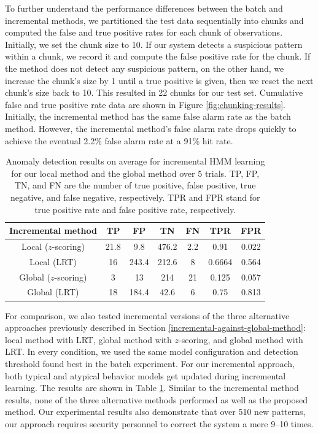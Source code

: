 To further understand the performance differences between the batch
and incremental methods, we partitioned the test data sequentially
into chunks and computed the false and true positive rates for each
chunk of observations.  Initially, we set the chunk size to 10. If our
system detects a suspicious pattern within a chunk, we record it and
compute the false positive rate for the chunk. If the method does not
detect any suspicious pattern, on the other hand, we increase the
chunk's size by 1 until a true positive is given, then we reset the
next chunk's size back to 10. This resulted in 22 chunks for our test
set. Cumulative false and true positive rate data are shown in
Figure \ref{fig:chunking-results}. Initially, the incremental
method has the same false alarm rate as the batch method.  However,
the incremental method's false alarm rate drops quickly to achieve the
eventual 2.2\% false alarm rate at a 91\% hit rate.

\begin{table}[t]
  \caption[Anomaly detection results on average for incremental HMM
    learning for our local method and the global method over 5
    trials.]{\small Anomaly detection results on average for
    incremental HMM learning for our local method and the global
    method over 5 trials. TP, FP, TN, and FN are the number of true positive, 
    false positive, true negative, and false negative, respectively. 
    TPR and FPR stand for true positive rate and false positive rate, 
    respectively.}
  \begin{center}
    \begin{tabular}{c|c|c|c|c|c|c}
      \hline
      Incremental method & TP & FP & TN & FN & TPR & FPR \\
      \hline \hline
      Local ($z$-scoring) & 21.8 & 9.8  & 476.2  & 2.2 & 0.91 & 0.022 \\ \hline
      Local (LRT) & 16 & 243.4 & 212.6 & 8 & 0.6664 & 0.564 \\ \hline
      Global ($z$-scoring)  & 3 & 13 & 214 & 21 & 0.125 & 0.057 \\ \hline
      Global (LRT)  & 18 & 184.4 & 42.6 & 6 & 0.75 & 0.813 \\ \hline
    \end{tabular}
  \end{center}
  \label{tab:iml-detection-results}
\end{table}

For comparison, we also tested incremental versions of the three
alternative approaches previously described in Section
\ref{incremental-against-global-method}: local method with LRT, global method
with $z$-scoring, and global method with LRT. In every condition, we
used the same model configuration and detection threshold found best
in the batch experiment.  For our incremental approach, both typical
and atypical behavior models get updated during incremental learning.
The results are shown in Table \ref{tab:iml-detection-results}.
Similar to the incremental method results, none of the three alternative
methods performed as well as the proposed method. Our experimental
results also demonstrate that over 510 new patterns, our approach
requires security personnel to correct the system a mere 9--10 times.

